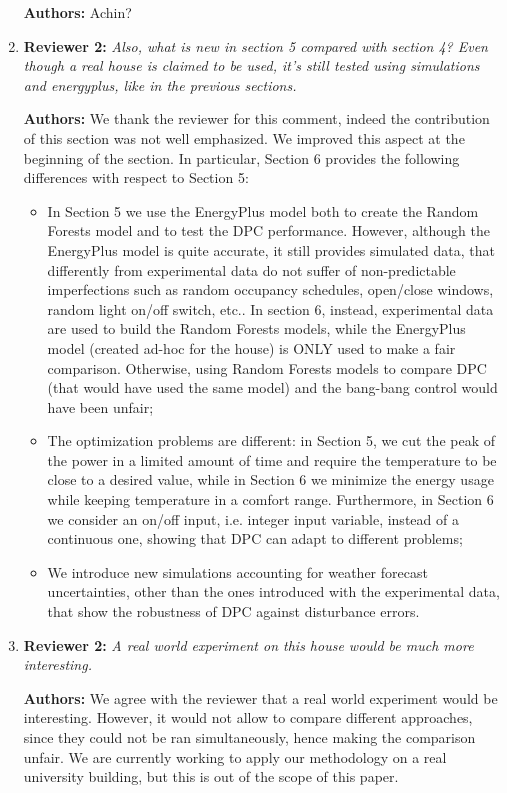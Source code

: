 \documentclass{article}
\begin{document}
\begin{enumerate}
\textbf{Authors:} Achin?

\item \textbf{Reviewer 2:} \textit{Also, what is new in section 5 compared with section 4? Even though a real house is claimed to be used, it's still tested using simulations and energyplus, like in the previous sections.}

\textbf{Authors:} We thank the reviewer for this comment, indeed the contribution of this section was not well emphasized. We improved this aspect at the beginning of the section. In particular, Section 6 provides the following differences with respect to Section 5:
\begin{itemize}
	\item In Section 5 we use the EnergyPlus model both to create the Random Forests model and to test the DPC performance.
	However, although the EnergyPlus model is quite accurate, it still provides simulated data, that differently from experimental data do not suffer of non-predictable imperfections such as random occupancy schedules, open/close windows, random light on/off switch, etc.. In section 6, instead, experimental data are used to build the Random Forests models, while the EnergyPlus model (created ad-hoc for the house) is ONLY used to make a fair comparison. Otherwise, using Random Forests models to compare DPC (that would have used the same model) and the bang-bang control would have been unfair;
	\item The optimization problems are different: in Section 5, we cut the peak of the power in a limited amount of time and require the temperature to be close to a desired value, while in Section 6 we minimize the energy usage while keeping temperature in a comfort range. Furthermore, in Section 6 we consider an on/off input, i.e. integer input variable, instead of a continuous one, showing that DPC can adapt to different problems;
	\item We introduce new simulations accounting for weather forecast uncertainties, other than the ones introduced with the experimental data, that show the robustness of DPC against disturbance errors.
\end{itemize}

\item \textbf{Reviewer 2:} \textit{A real world experiment on this house would be much more interesting.}

\textbf{Authors:} We agree with the reviewer that a real world experiment would be interesting.
However, it would not allow to compare different approaches, since they could not be ran simultaneously, hence making the comparison unfair.
We are currently working to apply our methodology on a real university building, but this is out of the scope of this paper.


\end{enumerate}
\end{document}
